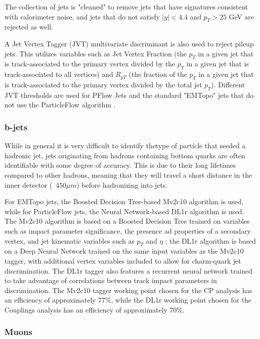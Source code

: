 The collection of jets is "cleaned" to remove jets that have signatures consistent with calorimeter noise, and jets that do not satisfy $|y| < 4.4$ and $p_{T} > 25$ GeV are rejected as well. 

A Jet Vertex Tagger (JVT) multivariate discriminant is also used to reject pileup jets. This utilizes variables such as Jet Vertex Fraction (the $p_{T}$ in a given jet that is track-associated to the primary vertex divided by the $p_{T}$ in a given jet that is track-associated to all vertices) and $R_{pT}$ (the fraction of the $p_{T}$ in a given jet that is track-associated to the primary vertex divided by the total jet $p_{T}$). Different JVT thresholds are used for PFlow Jets and the standard "EMTopo" jets that do not use the ParticleFlow algorithm \cite{JVT}.

\subsubsection{b-jets} \label{sec:b-jets} 

While in general it is very difficult to identify thetype of particle that seeded a hadronic jet, jets originating from hadrons containing bottom quarks are often identifiable with some degree of accuracy. This is due to their long lifetimes compared to other hadrons, meaning that they will travel a short distance in the inner detector (~$450 \mu m$) before hadronizing into jets. 

For EMTopo jets, the Boosted Decision Tree-based Mv2c10 algorithm is used, while for ParticleFlow jets, the Neural Network-based DL1r algorithm is used. The Mv2c10 algorithm is based on a Boosted Decision Tree trained on variables such as impact parameter significance, the presence ad properties of a secondary vertex, and jet kinematic variables such as $p_{T}$ and $\eta$ \cite{CERN-EP-2018-047} \cite{CERN-PH-EP-2015-216}; the DL1r algorithm is based on a Deep Neural Network \cite{ATL-PHYS-PUB-2017-013} trained on the same input variables as the Mv2c10 tagger, with additional vertex variables included to allow for charm-quark jet discrimination. The DL1r tagger also features a recurrent neural network trained to take advantage of correlations between track impact parameters in discrimination. The Mv2c10 tagger working point chosen for the CP analysis has an efficiency of approximately 77$\%$, while the DL1r working point chosen for the Couplings analysis has an efficiency of approximately 70$\%$.  

\subsubsection{Muons} \label{sec:Muons} 

